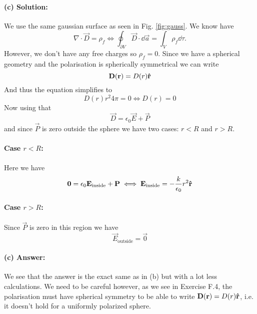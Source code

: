 \paragraph{(c) Solution:}  We use the same gaussian surface as seen in Fig. \ref{fig:gauss}. We know have
\begin{equation}
    \nabla \cdot \vec{D} = \rho_f \iff \oint_{\partial V} \vec{D} \cdot \dd \vec{a} = \int_V \rho_f \dd\tau.
\end{equation}
However, we don't have any free charges so $\rho_f = 0$. Since we have a spherical geometry and the polarisation is spherically symmetrical we can write
\begin{equation}
    \mathbf{D}(\mathbf{r}) = D(r) \mathbf{\hat{r}}
\end{equation}
And thus the equation simplifies to
\begin{equation}
    D(r) r^2 4 \pi = 0 \iff D(r) = 0
\end{equation}
Now using that
\begin{equation}
    \vec{D} = \epsilon_0 \vec{E} + \vec{P}
\end{equation}
and since $\vec{P}$ is zero outside the sphere we have two cases: $r< R$ and $r> R$.
\paragraph{Case $r<R$:} Here we have
\begin{equation}
    \mathbf{0} = \epsilon_0 \mathbf{E}_\text{inside} + \mathbf{P} \iff \mathbf{E}_\text{inside} = -\frac{k}{\epsilon_0} r^2 \mathbf{\hat{r}}
\end{equation}

\paragraph{Case $r > R$:} Since $\vec{P}$ is zero in this region we have
\begin{equation}
    \vec{E}_\text{outside} = \vec{0}
\end{equation}
\paragraph{(c) Answer:} We see that the answer is the exact same as in (b) but with a lot less calculations. We need to be careful however, as we see in Exercise F.4, the polarisation must have spherical symmetry to be able to write $\mathbf{D}(\mathbf{r}) = D(r)\mathbf{\hat{r}}$, i.e. it doesn't hold for a uniformly polarized sphere.